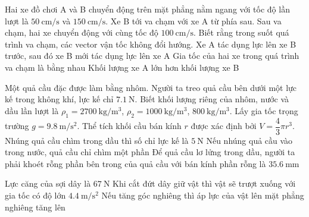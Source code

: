 \begin{ex}
	Hai xe đồ chơi A và B chuyển động trên mặt phẳng nằm ngang với tốc độ lần lượt là $\SI{50}{\centi\meter/\second}$ và $\SI{150}{\centi\meter/\second}$. Xe B tới va chạm với xe A từ phía sau. Sau va chạm, hai xe chuyển động với cùng tốc độ $\SI{100}{\centi\meter/\second}$. Biết rằng trong suốt quá trình va chạm, các vector vận tốc không đổi hướng.
	{Xe A tác dụng lực lên xe B trước, sau đó xe B mới tác dụng lực lên xe A}
	{Gia tốc của hai xe trong quá trình va chạm là bằng nhau}
	{Khối lượng xe A lớn hơn khối lượng xe B}
	\loigiai{}
\end{ex}
\begin{ex}
	Một quả cầu đặc được làm bằng nhôm. Người ta treo quả cầu bên dưới một lực kế trong không khí, lực kế chỉ $\SI{7.1}{\newton}$. Biết khối lượng riêng của nhôm, nước và dầu lần lượt là $\rho_1=\SI{2700}{\kilogram/\meter^3}$, $\rho_2=\SI{1000}{\kilogram/\meter^3}$, $\SI{800}{\kilogram/\meter^3}$. Lấy gia tốc trọng trường $g=\SI{9.8}{\meter/\second^2}$. Thể tích khối cầu bán kính $r$ được xác định bởi $V=\dfrac{4}{3}\pi r^3$.
	{\True Nhúng quả cầu chìm trong dầu thì số chỉ lực kế là $\SI{5}{\newton}$}
	{Nếu nhúng quả cầu vào trong nước, quả cầu chỉ chìm một phần}
	{\True Để quả cầu lơ lửng trong dầu, người ta phải khoét rỗng phần bên trong của quả cầu với bán kính phần rỗng là $\SI{35.6}{\milli\meter}$}
	\loigiai{}
\end{ex}
\begin{ex}
	{\True Lực căng của sợi dây là $\SI{67}{\newton}$}
	{\True Khi cắt đứt dây giữ vật thì vật sẽ trượt xuống với gia tốc có độ lớn $\SI{4.4}{\meter/\second^2}$}
	{Nếu tăng góc nghiêng thì áp lực của vật lên mặt phẳng nghiêng tăng lên}
\end{ex}
